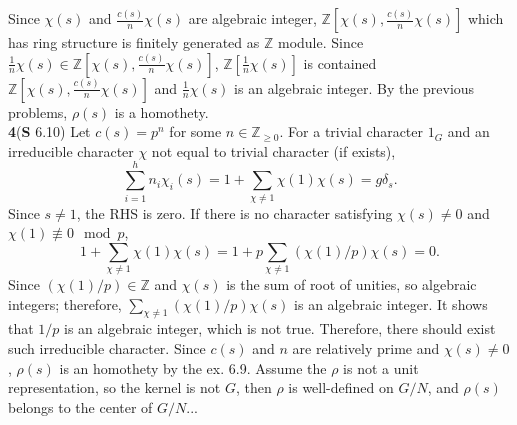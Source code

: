\documentclass[a4paper, 12pt]{article}
\theoremstyle{Mydefinition}
\theoremstyle{Mytheorem}
\begin{document}
Since $\chi(s)$ and $\frac{c(s)}{n}\chi(s)$ are algebraic integer, $\mathbb{Z}\left[\chi(s), \frac{c(s)}{n}\chi(s)\right]$ which has ring structure is finitely generated as $\mathbb{Z}$ module. Since $\frac{1}{n}\chi(s)\in \mathbb{Z}\left[\chi(s), \frac{c(s)}{n}\chi(s)\right]$, $\mathbb{Z}\left[\frac{1}{n}\chi(s)\right]$ is contained $\mathbb{Z}\left[\chi(s), \frac{c(s)}{n}\chi(s)\right]$ and $\frac{1}{n}\chi(s)$ is an algebraic integer. By the previous problems, $\rho(s)$ is a homothety.\\

\noindent \textbf{4}(\textbf{S} 6.10)
Let $c(s) = p^n$ for some $n\in\mathbb{Z}_{\geq 0}$. For a trivial character $1_G$ and an irreducible character $\chi$ not equal to trivial character (if exists),
\begin{equation}
    \sum_{i=1}^h n_i\chi_i(s) = 1 + \sum_{\chi\neq 1}\chi(1)\chi(s) = g\delta_{s}.
\end{equation}
Since $s\neq 1$, the RHS is zero. If there is no character satisfying $\chi(s)\neq 0$ and $\chi(1)\not\equiv 0\mod p$,
\begin{equation}
    1 + \sum_{\chi\neq 1}\chi(1)\chi(s) = 1+p\sum_{\chi\neq 1}(\chi(1)/p)\chi(s) = 0.
\end{equation}
Since $(\chi(1)/p)\in\mathbb{Z}$ and $\chi(s)$ is the sum of root of unities, so algebraic integers; therefore, $\sum_{\chi\neq 1}(\chi(1)/p)\chi(s)$ is an algebraic integer. It shows that $1/p$ is an algebraic integer, which is not true. Therefore, there should exist such irreducible character. Since $c(s)$ and $n$ are relatively prime and $\chi(s)\neq 0$, $\rho(s)$ is an homothety by the ex. 6.9. Assume the $\rho$ is not a unit representation, so the kernel is not $G$, then $\rho$ is well-defined on $G/N$, and $\rho(s)$ belongs to the center of $G/N$...\\
\end{document}
